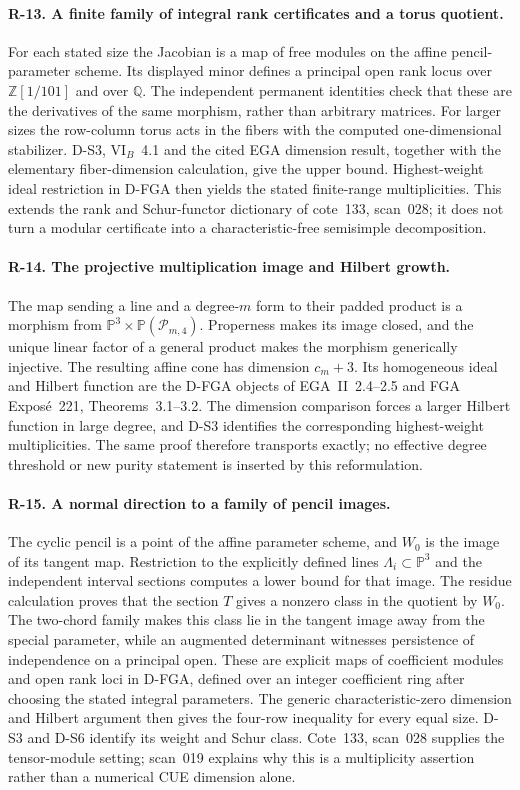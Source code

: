 \documentclass[11pt,a4paper]{article}
\theoremstyle{definition}\newtheorem{definition}{Definition}
\begin{document}
\paragraph{R-13. A finite family of integral rank certificates and a torus quotient.}
For each stated size the Jacobian is a map of free modules on the affine pencil-parameter scheme. Its displayed minor defines a principal open rank locus over $\mathbb Z[1/101]$ and over $\mathbb Q$. The independent permanent identities check that these are the derivatives of the same morphism, rather than arbitrary matrices. For larger sizes the row-column torus acts in the fibers with the computed one-dimensional stabilizer. D-S3, VI$_B$~4.1 and the cited EGA dimension result, together with the elementary fiber-dimension calculation, give the upper bound. Highest-weight ideal restriction in D-FGA then yields the stated finite-range multiplicities. This extends the rank and Schur-functor dictionary of cote~133, scan~028; it does not turn a modular certificate into a characteristic-free semisimple decomposition.

\paragraph{R-14. The projective multiplication image and Hilbert growth.}
The map sending a line and a degree-$m$ form to their padded product is a morphism from $\mathbb P^3\times\mathbb P(\mathcal P_{m,4})$. Properness makes its image closed, and the unique linear factor of a general product makes the morphism generically injective. The resulting affine cone has dimension $c_m+3$. Its homogeneous ideal and Hilbert function are the D-FGA objects of EGA~II~2.4--2.5 and FGA Expos\'e~221, Theorems~3.1--3.2. The dimension comparison forces a larger Hilbert function in large degree, and D-S3 identifies the corresponding highest-weight multiplicities. The same proof therefore transports exactly; no effective degree threshold or new purity statement is inserted by this reformulation.

\paragraph{R-15. A normal direction to a family of pencil images.}
The cyclic pencil is a point of the affine parameter scheme, and $W_0$ is the image of its tangent map. Restriction to the explicitly defined lines $\Lambda_i\subset\mathbb P^3$ and the independent interval sections computes a lower bound for that image. The residue calculation proves that the section $T$ gives a nonzero class in the quotient by $W_0$. The two-chord family makes this class lie in the tangent image away from the special parameter, while an augmented determinant witnesses persistence of independence on a principal open. These are explicit maps of coefficient modules and open rank loci in D-FGA, defined over an integer coefficient ring after choosing the stated integral parameters. The generic characteristic-zero dimension and Hilbert argument then gives the four-row inequality for every equal size. D-S3 and D-S6 identify its weight and Schur class. Cote~133, scan~028 supplies the tensor-module setting; scan~019 explains why this is a multiplicity assertion rather than a numerical CUE dimension alone.
\end{document}
